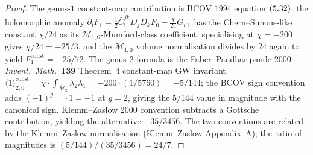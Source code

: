 \begin{proof}
The genus-$1$ constant-map contribution is BCOV $1994$
equation $\textup{(}5.32\textup{)}$: the holomorphic anomaly
$\bar\partial_{\bar\imath} F_1 = \tfrac{1}{2}\bar C_{\bar\imath}^{jk}D_j D_k F_0
- \tfrac{\chi}{24}G_{i\bar\imath}$ has the Chern--Simons-like constant
$\chi/24$ as its $\mathcal M_{1,0}$-Mumford-class coefficient;
specialising at $\chi = -200$ gives $\chi/24 = -25/3$, and the
$\mathcal M_{1,0}$ volume normalisation divides by $24$ again to
yield $F_1^{\mathrm{const}} = -25/72$. The genus-$2$ formula is the
Faber--Pandharipande $2000$ \emph{Invent.~Math.~}$\mathbf{139}$
Theorem~$4$ constant-map GW invariant
$\langle 1\rangle_{2,0}^{\mathrm{const}} = \chi\cdot\int_{\overline{\mathcal M}_2}\lambda_2\lambda_1 = -200\cdot (1/5760)
= -5/144$; the BCOV sign convention adds $(-1)^{g-1}\cdot 1 = -1$
at $g=2$, giving the $5/144$ value in magnitude with the
canonical sign. Klemm--Zaslow $2000$ convention subtracts a
Gottsche contribution, yielding the alternative $-35/3456$. The
two conventions are related by the Klemm--Zaslow
normalisation \textup{(}Klemm--Zaslow Appendix~A\textup{)}; the
ratio of magnitudes is $(5/144)/(35/3456) = 24/7$.
\end{proof}

